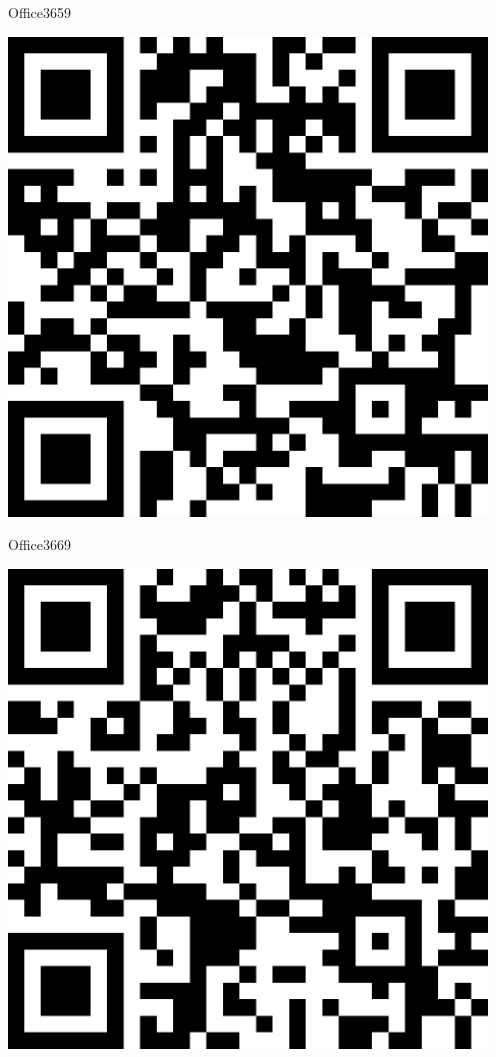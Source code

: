 \documentclass[letterpaper]{article}
\begin{document}
 \hfill{\small Office3659} 

 \vspace{1in} 
 \pagebreak 
{} 
 \vspace*{\fill} 
 \begingroup 
 \centerline{\includegraphics[scale=1,width=5in,height=5in]{Office3669.png}} 
 \endgroup 
 \vspace*{\fill} 

 \hfill{\small Office3669} 

 \vspace{1in} 
 \pagebreak 
{} 
 \vspace*{\fill} 
 \begingroup 
 \centerline{\includegraphics[scale=1,width=5in,height=5in]{Office3671.png}} 
 \endgroup 
 \vspace*{\fill} 
\end{document}
